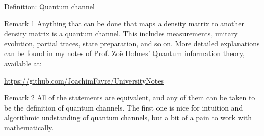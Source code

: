 \documentclass[a4paper]{article}
\begin{document}
\begin{parag}{Definition: Quantum channel}
    \begin{subparag}{Remark 1}
        Anything that can be done that maps a density matrix to another density matrix is a quantum channel. This includes measurements, unitary evolution, partial traces, state preparation, and so on. More detailed explanations can be found in my notes of Prof. Zoë Holmes' Quantum information theory, available at:
        \begin{center}
            \url{https://github.com/JoachimFavre/UniversityNotes}
        \end{center}
    \end{subparag}

    \begin{subparag}{Remark 2}
        All of the statements are equivalent, and any of them can be taken to be the definition of quantum channels. The first one is nice for intuition and algorithmic undstanding of quantum channels, but a bit of a pain to work with mathematically.
    \end{subparag}
\end{parag}
\end{document}
